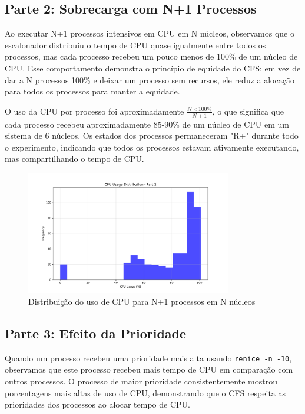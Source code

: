 \documentclass[12pt,a4paper]{article}
\begin{document}
\subsection{Parte 2: Sobrecarga com N+1 Processos}

Ao executar N+1 processos intensivos em CPU em N núcleos, observamos que o escalonador distribuiu o tempo de CPU quase igualmente entre todos os processos, mas cada processo recebeu um pouco menos de 100\% de um núcleo de CPU. Esse comportamento demonstra o princípio de equidade do CFS: em vez de dar a N processos 100\% e deixar um processo sem recursos, ele reduz a alocação para todos os processos para manter a equidade.

O uso da CPU por processo foi aproximadamente $\frac{N \times 100\%}{N+1}$, o que significa que cada processo recebeu aproximadamente 85-90\% de um núcleo de CPU em um sistema de 6 núcleos. Os estados dos processos permaneceram "R+" durante todo o experimento, indicando que todos os processos estavam ativamente executando, mas compartilhando o tempo de CPU.

\begin{figure}[H]
    \centering
    \includegraphics[width=0.8\textwidth]{figures/cpu_dist_part2.pdf}
    \caption{Distribuição do uso de CPU para N+1 processos em N núcleos}
    \label{fig:part2_cpu}
\end{figure}

\subsection{Parte 3: Efeito da Prioridade}

Quando um processo recebeu uma prioridade mais alta usando \texttt{renice -n -10}, observamos que este processo recebeu mais tempo de CPU em comparação com outros processos. O processo de maior prioridade consistentemente mostrou porcentagens mais altas de uso de CPU, demonstrando que o CFS respeita as prioridades dos processos ao alocar tempo de CPU.
\end{document}
